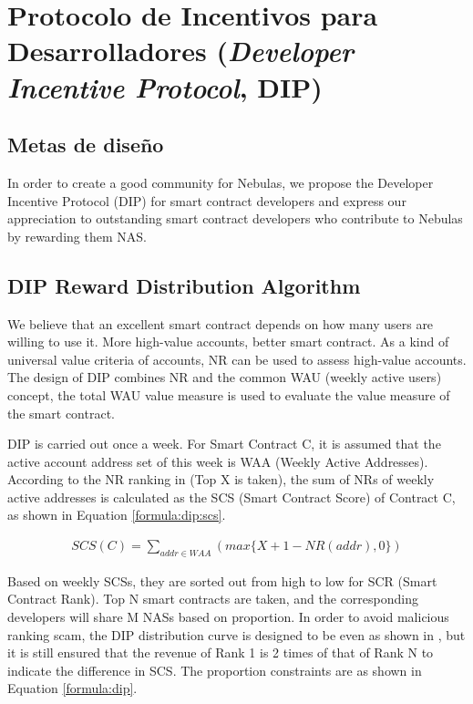\section{Protocolo de Incentivos para Desarrolladores (\textit{Developer Incentive Protocol}, DIP)}
\label{sec:dip}

\subsection{Metas de diseño}
\label{dip:design}

In order to create a good community for Nebulas, we propose the Developer Incentive Protocol (DIP) for smart contract developers and express our appreciation to outstanding smart contract developers who contribute to Nebulas by rewarding them NAS.

\subsection{DIP Reward Distribution Algorithm}
\label{dip:arith}

We believe that an excellent smart contract depends on how many users are willing to use it. More high-value accounts, better smart contract. As a kind of universal value criteria of accounts, NR can be used to assess high-value accounts. The design of DIP combines NR and the common WAU (weekly active users) concept, the total WAU value measure is used to evaluate the value measure of the smart contract.

DIP is carried out once a week. For Smart Contract C, it is assumed that the active account address set of this week is WAA (Weekly Active Addresses). According to the NR ranking in  (Top X is taken), the sum of NRs of weekly active addresses is calculated as the SCS (Smart Contract Score) of Contract C, as shown in Equation \ref{formula:dip:scs}.

\begin{align}
\label{formula:dip:scs}
SCS(C)=\sum_{addr \in WAA}(max\{X + 1 - NR(addr), 0\})
\end{align}

Based on weekly SCSs, they are sorted out from high to low for SCR (Smart Contract Rank). Top N smart contracts are taken, and the corresponding developers will share M NASs based on proportion. In order to avoid malicious ranking scam, the DIP distribution curve is designed to be even as shown in , but it is still ensured that the revenue of Rank 1 is 2 times of that of Rank N to indicate the difference in SCS. The proportion constraints are as shown in Equation \ref{formula:dip}.

